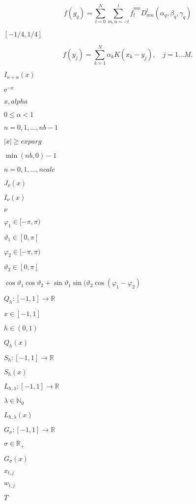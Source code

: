 \documentclass{article}
\begin{document}
\[ f(g_q)=\sum^{N}_{l=0}\sum_{m,n=-l}^l \hat f^{mn}_l D_{mn}^l(\alpha_q,\beta_q,\gamma_q) \]
\pagebreak

$[-1/4,1/4]$
\pagebreak

\[ f(y_j) = \sum_{k=1}^N \alpha_k K(x_k-y_j),\quad j=1\dots M. \]
\pagebreak

$I_{n+\alpha}(x)$
\pagebreak

$\mathrm{e}^{-x}$
\pagebreak

$x,alpha$
\pagebreak

$0 \le \alpha < 1$
\pagebreak

$n=0,1,\ldots,nb-1$
\pagebreak

$|x| \ge exparg$
\pagebreak

$\min(nb,0)-1$
\pagebreak

$n=0,1,\ldots,ncalc$
\pagebreak

$J_{\nu}(x)$
\pagebreak

$I_{\nu}(x)$
\pagebreak

$\nu$
\pagebreak

$\varphi_1 \in [-\pi,\pi)$
\pagebreak

$\vartheta_1 \in [0,\pi]$
\pagebreak

$\varphi_2 \in [-\pi,\pi)$
\pagebreak

$\vartheta_2 \in [0,\pi]$
\pagebreak

$\cos \vartheta_1 \cos \vartheta_2 + \sin \vartheta_1 \sin(\vartheta_2 \cos(\varphi_1 - \varphi_2)$
\pagebreak

$Q_h: [-1,1] \rightarrow \mathbb{R}$
\pagebreak

$x \in [-1,1]$
\pagebreak

$h \in (0,1)$
\pagebreak

$Q_h(x)$
\pagebreak

$S_h: [-1,1] \rightarrow \mathbb{R}$
\pagebreak

$S_h(x)$
\pagebreak

$L_{h,\lambda}: [-1,1] \rightarrow \mathbb{R}$
\pagebreak

$\lambda \in \mathbb{N}_0$
\pagebreak

$L_{h,\lambda}(x)$
\pagebreak

$G_\sigma: [-1,1] \rightarrow \mathbb{R}$
\pagebreak

$\sigma \in \mathbb{R}_+$
\pagebreak

$G_\sigma(x)$
\pagebreak

$x_{t,j}$
\pagebreak

$w_{t,j}$
\pagebreak

$T$
\pagebreak
\end{document}
